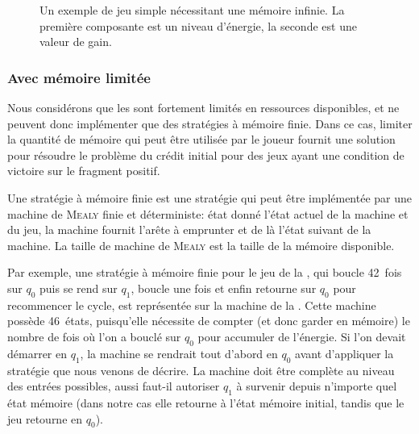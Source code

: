 \begin{figure}[ht]
\centering
{}
\caption[Un exemple de jeu simple nécessitant une mémoire infinie.]{Un exemple de jeu simple nécessitant une mémoire infinie. La première composante est un niveau d'énergie, la seconde est une valeur de gain.}%
\label{tj:fig:infmemoryneeded}
\end{figure}

\subsubsection{Avec mémoire limitée}

Nous considérons que les \rcsfs sont fortement limités en ressources disponibles, et ne peuvent donc implémenter que des stratégies à mémoire finie.
Dans ce cas, limiter \apriori la quantité de mémoire qui peut être utilisée par le joueur fournit une solution pour résoudre le problème du crédit initial pour des jeux ayant une condition de victoire sur le fragment positif.

Une stratégie à mémoire finie est une stratégie qui peut être implémentée par une machine de \textsc{Mealy} finie et déterministe: état donné l'état actuel de la machine et du jeu, la machine fournit l'arête à emprunter et de là l'état suivant de la machine.
La taille de machine de \textsc{Mealy} est la taille de la mémoire disponible.

Par exemple, une stratégie à mémoire finie pour le jeu de la , qui boucle 42~fois sur $q_0$ puis se rend sur $q_1$, boucle une fois et enfin retourne sur $q_0$ pour recommencer le cycle, est représentée sur la machine de la .
Cette machine possède 46~états, puisqu'elle nécessite de compter (et donc garder en mémoire) le nombre de fois où l'on a bouclé sur $q_0$ pour accumuler de l'énergie.
Si l'on devait démarrer en $q_1$, la machine se rendrait tout d'abord en $q_0$ avant d'appliquer la stratégie que nous venons de décrire.
La machine doit être complète au niveau des entrées possibles, aussi faut-il autoriser $q_1$ à survenir depuis n'importe quel état mémoire (dans notre cas elle retourne à l'état mémoire initial, tandis que le jeu retourne en $q_0$).


